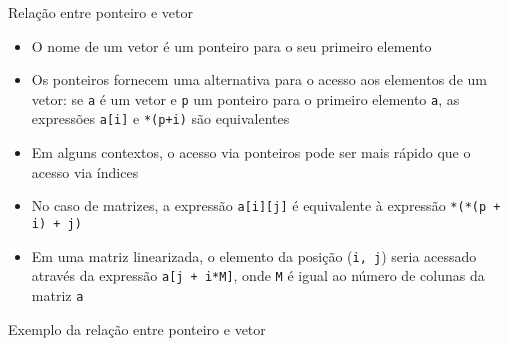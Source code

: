 \begin{frame}[fragile]{Relação entre ponteiro e vetor}

	\begin{itemize}
		\item O nome de um vetor é um ponteiro para o seu primeiro elemento

		\item Os ponteiros fornecem uma alternativa para o acesso aos elementos de um vetor: se 
        \texttt{\texttt{a}} é um vetor e \texttt{{p}} um ponteiro para o primeiro elemento 
        \texttt{{a}}, as expressões \texttt{{a[i]}} e \texttt{{*(p+i)}} são 
        equivalentes

		\item Em alguns contextos, o acesso via ponteiros pode ser mais rápido que o acesso via 
        índices

        \item No caso de matrizes, a expressão \texttt{{a[i][j]}} é equivalente à expressão
        \texttt{{*(*(p + i) + j)}}

        \item Em uma matriz linearizada, o elemento da posição (\texttt{i, j}) seria acessado
        através da expressão \texttt{a[j + i*M]}, onde \texttt{M} é igual ao número de colunas
        da matriz \texttt{a}
	\end{itemize}

\end{frame}

\begin{frame}[fragile]{Exemplo da relação entre ponteiro e vetor}
\end{frame}

